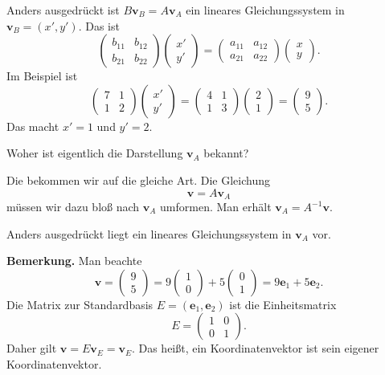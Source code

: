 \documentclass[9pt]{beamer}
\newcommand{\bv}[1]{\mathbf{#1}}
\newcommand{\strong}[1]{\textsf{\textbf{#1}}}
\newcommand{\parspace}{\vspace{0.8em}}
\begin{document}
\begin{frame}
Anders ausgedrückt ist $B\bv v_B = A\bv v_A$ ein lineares
Gleichungssystem in $\bv v_B=(x',y')$.\pause{} Das ist
\[\begin{pmatrix}b_{11} & b_{12}\\ b_{21} & b_{22}\end{pmatrix}\begin{pmatrix}x'\\ y'\end{pmatrix}
= \begin{pmatrix}a_{11} & a_{12}\\ a_{21} & a_{22}\end{pmatrix}\begin{pmatrix}x\\ y\end{pmatrix}.
\]\pause{}
Im Beispiel ist
\[\begin{pmatrix}7 & 1\\ 1 & 2\end{pmatrix}\begin{pmatrix}x'\\ y'\end{pmatrix}
= \begin{pmatrix}4 & 1\\ 1 & 3\end{pmatrix}\begin{pmatrix}2\\ 1\end{pmatrix}
= \begin{pmatrix}9\\ 5\end{pmatrix}.\]\pause
Das macht $x'=1$ und $y'=2$.
\end{frame}

\begin{frame}
Woher ist eigentlich die Darstellung $\bv v_A$ bekannt?\pause

\parspace
Die bekommen wir auf die gleiche Art.  Die Gleichung
\[\bv v = A\bv v_A\]
müssen wir dazu bloß nach $\bv v_A$ umformen. Man erhält
$\bv v_A = A^{-1}\bv v$.\pause

\parspace
Anders ausgedrückt liegt ein lineares Gleichungssystem
in $\bv v_A$ vor.
\end{frame}

\begin{frame}
\strong{Bemerkung.} Man beachte
\[\bv v = \begin{pmatrix}9\\ 5\end{pmatrix} = 
9\begin{pmatrix}1\\ 0\end{pmatrix} + 5\begin{pmatrix}0\\ 1\end{pmatrix}
= 9\bv e_1 + 5\bv e_2.\]\pause
Die Matrix zur Standardbasis $E=(\bv e_1,\bv e_2)$
ist die Einheitsmatrix
\[E=\begin{pmatrix}1 & 0\\ 0 & 1\end{pmatrix}.
\]\pause
Daher gilt $\bv v = E\bv v_E = \bv v_E$. Das heißt, ein Koordinatenvektor
ist sein eigener Koordinatenvektor. 
\end{frame}
\end{document}
